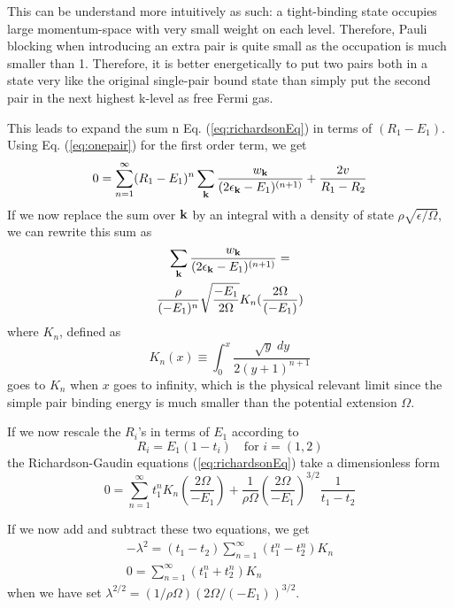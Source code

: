 \documentclass[3p,twocolumn]{elsarticle}
\begin{document}
This can be understand more intuitively as such: a tight-binding state occupies large momentum-space with very small weight on each level. Therefore, Pauli blocking when introducing an extra pair is quite small as the occupation is much smaller than 1. Therefore, it is better energetically to put two pairs both in a state very like the original single-pair bound state than simply put the second pair in the next highest k-level as free Fermi gas.   

This leads to expand the sum n Eq. (\ref{eq:richardsonEq}) in terms of $(R_{1}-E_{1})$.  Using Eq. (\ref{eq:onepair}) for the first order term, we get
\begin{equation}
0=\sum_{n=1}^{\infty}(R_{1}-E_{1})^{n}\sum_{\mathbf{k}}\frac{w_{\mathbf{k}}}{(2\epsilon_{\mathbf{k}}-E_1)^{(n+1)}}+\frac{2v}{R_1-R_2}
\end{equation}
If we now replace the sum over $\mathbf{k}$ by an integral with a density of state $\rho\sqrt{\epsilon/\Omega}$, we can rewrite this sum as
\begin{multline}
\sum_{\mathbf{k}}\frac{w_{\mathbf{k}}}{(2\epsilon_{\mathbf{k}}-E_1)^{(n+1)}}=\\\frac{\rho}{(-E_{1})^{n}}\sqrt{\frac{-E_{1}}{2\Omega}}K_{n}(\frac{2\Omega}{(-E_{1})})
\end{multline}
where $K_{n}$, defined as
\begin{equation}
K_{n}(x)\equiv\int_{0}^{x}\frac{\sqrt{y}\;dy}{2(y+1)^{n+1}}
\end{equation}
goes to $K_{n}$ when $x$ goes to infinity, which is the physical relevant limit since the simple pair binding energy is much smaller than the potential extension $\Omega$.

If we now rescale the $R_{i}$'s in terms of $E_{1}$ according to
\begin{equation}
R_{i}=E_{1}(1-t_{i})\quad\text{for }i=(1,2)
\end{equation}
the Richardson-Gaudin equations (\ref{eq:richardsonEq}) take a dimensionless form
\begin{equation}
0=\sum_{n=1}^{\infty}t_{1}^{n}K_{n}(\frac{2\Omega}{-E_{1}})+\frac{1}{\rho\Omega}\left(\frac{2\Omega}{-E_{1}}\right)^{3/2}\frac{1}{t_1-t_2}
\end{equation}

If we now add and subtract these two equations, we get
\begin{gather}
-\lambda^{2}=(t_{1}-t_{2})\sum_{n=1}^{\infty}(t_{1}^{n}-t_{2}^{n})K_{n}\label{eq:t1}\\
0=\sum_{n=1}^{\infty}(t_{1}^{n}+t_{2}^{n})K_{n}\label{eq:t2}
\end{gather}
when we have set $\lambda^{2/2}=(1/\rho\Omega)(2\Omega/(-E_{1}))^{3/2}$.
\end{document}
